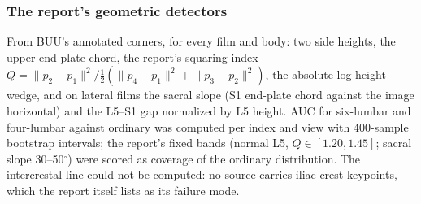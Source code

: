 \documentclass[11pt,letterpaper]{article}
\begin{document}
\subsubsection*{The report's geometric detectors}
From BUU's annotated corners, for every film and body: two side heights, the upper end-plate chord, the report's squaring index $Q = \lVert p_2-p_1\rVert^2 / \tfrac12(\lVert p_4-p_1\rVert^2+\lVert p_3-p_2\rVert^2)$, the absolute log height-wedge, and on lateral films the sacral slope (S1 end-plate chord against the image horizontal) and the L5--S1 gap normalized by L5 height. AUC for six-lumbar and four-lumbar against ordinary was computed per index and view with 400-sample bootstrap intervals; the report's fixed bands (normal L5, $Q\in[1.20,1.45]$; sacral slope 30--50$^\circ$) were scored as coverage of the ordinary distribution. The intercrestal line could not be computed: no source carries iliac-crest keypoints, which the report itself lists as its failure mode.


\end{document}
